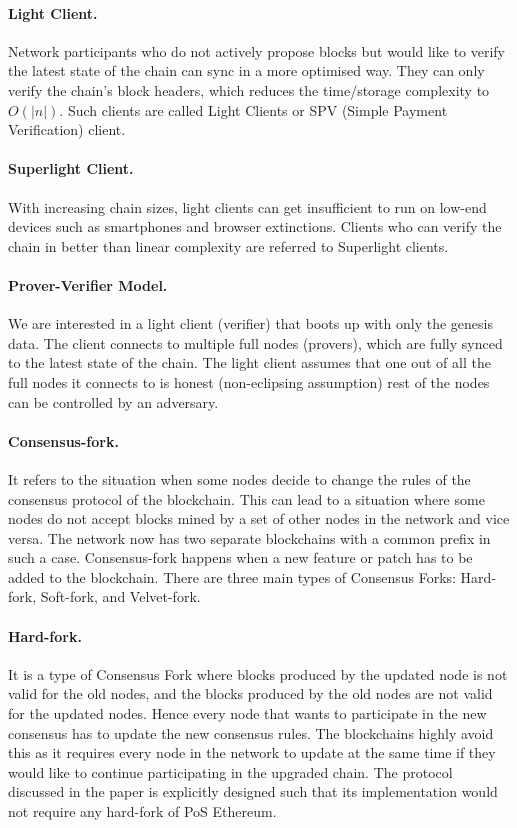 \documentclass[a4paper,11pt,oneside]{article}
\theoremstyle{definition}
\begin{document}
  \paragraph{Light Client.} Network participants who do not actively propose blocks but would like to verify the latest state of the chain can sync in a more optimised way. They can only verify the chain's block headers, which reduces the time/storage complexity to $O(|n|)$. Such clients are called Light Clients or SPV (Simple Payment Verification) client.
  
  \paragraph{Superlight Client.} With increasing chain sizes, light clients can get insufficient to run on low-end devices such as smartphones and browser extinctions. Clients who can verify the chain in better than linear complexity are referred to Superlight clients.  
  
  \paragraph{Prover-Verifier Model.} We are interested in a light client (verifier) that boots up with only the genesis data. The client connects to multiple full nodes (provers), which are fully synced to the latest state of the chain. The light client assumes that one out of all the full nodes it connects to is honest (non-eclipsing assumption) rest of the nodes can be controlled by an adversary.  
  
  \paragraph{Consensus-fork.} It refers to the situation when some nodes decide to change the rules of the consensus protocol of the blockchain. This can lead to a situation where some nodes do not accept blocks mined by a set of other nodes in the network and vice versa. The network now has two separate blockchains with a common prefix in such a case. Consensus-fork happens when a new feature or patch has to be added to the blockchain. There are three main types of Consensus Forks: Hard-fork, Soft-fork, and Velvet-fork. 
  
  \paragraph{Hard-fork.} It is a type of Consensus Fork where blocks produced by the updated node is not valid for the old nodes, and the blocks produced by the old nodes are not valid for the updated nodes. Hence every node that wants to participate in the new consensus has to update the new consensus rules. The blockchains highly avoid this as it requires every node in the network to update at the same time if they would like to continue participating in the upgraded chain. The protocol discussed in the paper is explicitly designed such that its implementation would not require any hard-fork of PoS Ethereum. 
  
\end{document}
